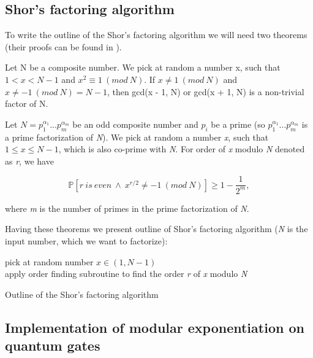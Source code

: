 \subsection{Shor's factoring algorithm}

To write the outline of the Shor's factoring algorithm we will need two theorems (their proofs can be found in \cite{nielsen_chuang}).

\begin{theorem}
Let N be a composite number. We pick at random a number x, such that $1 < x < N - 1$ and $x^2 \equiv 1\ (mod\ N)$. If $x \neq 1\ (mod\ N)$ and $x \neq -1\ (mod\ N) = N - 1$, then gcd(x - 1, N) or gcd(x + 1, N) is a non-trivial factor of N.
\end{theorem}

\begin{theorem}
Let $N = p_1^{\alpha_1}...p_m^{\alpha_m}$ be an odd composite number and $p_i$ be a prime (so $ p_1^{\alpha_1}...p_m^{\alpha_m}$ is a prime factorization of \textit{N}). We pick at random a number \textit{x}, such that $1 \leq x \leq N - 1$, which is also co-prime with \textit{N}. For order of \textit{x} modulo \textit{N} denoted as \textit{r}, we have

\[ \mathbb{P}[r\ is\ even\ \wedge\ x^{r/2} \neq -1\ (mod\ N)] \geq 1 - \frac{1}{2^m},\]

where \textit{m} is the number of primes in the prime factorization of \textit{N}.
\end{theorem}

Having these theorems we present outline of Shor's factoring algorithm (\textit{N} is the input number, which we want to factorize):

\begin{algorithm}[H]
    pick at random number $x \in (1, N - 1)$ \\
    apply order finding subroutine to find the order \textit{r} of \textit{x} modulo \textit{N}\\
    \caption{Outline of the Shor's factoring algorithm}
\end{algorithm}

\subsection{Implementation of modular exponentiation on quantum gates} \label{modular_exponentiation}

